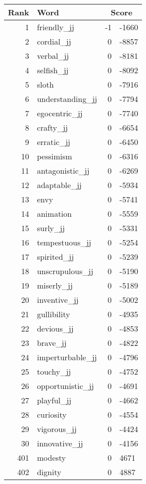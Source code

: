 \begin{longtable}[!htbp]{| rlr@{.}l |}
    \hline
    \textbf{Rank} & \textbf{Word} & \multicolumn{2}{c|}{\textbf{Score}} \\
    \hline
    \endhead
    1 & friendly\_jj & -1 & -1660 \\
    2 & cordial\_jj & 0 & -8857 \\
    3 & verbal\_jj & 0 & -8181 \\
    4 & selfish\_jj & 0 & -8092 \\
    5 & sloth & 0 & -7916 \\
    6 & understanding\_jj & 0 & -7794 \\
    7 & egocentric\_jj & 0 & -7740 \\
    8 & crafty\_jj & 0 & -6654 \\
    9 & erratic\_jj & 0 & -6450 \\
    10 & pessimism & 0 & -6316 \\
    11 & antagonistic\_jj & 0 & -6269 \\
    12 & adaptable\_jj & 0 & -5934 \\
    13 & envy & 0 & -5741 \\
    14 & animation & 0 & -5559 \\
    15 & surly\_jj & 0 & -5331 \\
    16 & tempestuous\_jj & 0 & -5254 \\
    17 & spirited\_jj & 0 & -5239 \\
    18 & unscrupulous\_jj & 0 & -5190 \\
    19 & miserly\_jj & 0 & -5189 \\
    20 & inventive\_jj & 0 & -5002 \\
    21 & gullibility & 0 & -4935 \\
    22 & devious\_jj & 0 & -4853 \\
    23 & brave\_jj & 0 & -4822 \\
    24 & imperturbable\_jj & 0 & -4796 \\
    25 & touchy\_jj & 0 & -4752 \\
    26 & opportunistic\_jj & 0 & -4691 \\
    27 & playful\_jj & 0 & -4662 \\
    28 & curiosity & 0 & -4554 \\
    29 & vigorous\_jj & 0 & -4424 \\
    30 & innovative\_jj & 0 & -4156 \\
    401 & modesty & 0 & 4671 \\
    402 & dignity & 0 & 4887 \\

\end{longtable}
